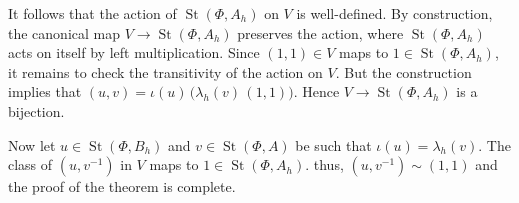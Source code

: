 \documentclass[oneside, 11pt]{amsart} \pdfoutput=1
\newcommand{\St}{\mathop{\mathrm{St}}\nolimits}
\numberwithin{equation}{section}
\theoremstyle{definition}
\begin{document}
It follows that the action of $\St(\Phi, A_h)$ on $V$ is well-defined. By construction, the canonical map \(V \to \St(\Phi, A_h)\) preserves the action, where \(\St(\Phi, A_h)\) acts on itself by left multiplication. Since \((1, 1) \in V\) maps to \(1 \in \St(\Phi, A_h)\), it remains to check the transitivity of the action on \(V\). But the construction implies that \((u, v) = \iota(u)\, \bigl(\lambda_h(v)\, (1, 1)\bigr)\). Hence \(V \to \St(\Phi, A_h)\) is a bijection.

Now let \(u \in \St(\Phi, B_h)\) and \(v \in \St(\Phi, A)\) be such that \(\iota(u) = \lambda_h(v)\). The class of \((u, v^{-1})\) in \(V\) maps to \(1 \in \St(\Phi, A_h)\). thus, \((u, v^{-1}) \sim (1, 1)\) and the proof of the theorem is complete.

\printbibliography
\end{document}
